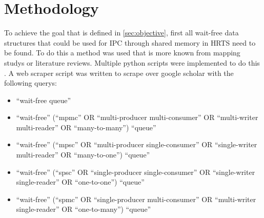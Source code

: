 \chapter{Methodology}\label{ch:methodology}
To achieve the goal that is defined in \cref{sec:objective}, first all wait-free data structures that could be used for \ac{IPC} through shared memory in \ac{HRTS} need to be found. To do this a method was used that is more known from mapping studys or literature reviews. Multiple python scripts were implemented to do this \cite{githubMA}. A web scraper script was written to scrape over google scholar with the following querys:
\begin{itemize}
   \item \enquote{wait-free queue}
   \item \enquote{wait-free} (\enquote{mpmc} OR \enquote{multi-producer multi-consumer} OR \enquote{multi-writer multi-reader} OR \enquote{many-to-many}) \enquote{queue}
   \item \enquote{wait-free} (\enquote{mpsc} OR \enquote{multi-producer single-consumer} OR \enquote{single-writer multi-reader} OR \enquote{many-to-one}) \enquote{queue}
   \item \enquote{wait-free} (\enquote{spsc} OR \enquote{single-producer single-consumer} OR \enquote{single-writer single-reader} OR \enquote{one-to-one}) \enquote{queue}
   \item \enquote{wait-free} (\enquote{spmc} OR \enquote{single-producer multi-consumer} OR \enquote{multi-writer single-reader} OR \enquote{one-to-many}) \enquote{queue}
\end{itemize}
